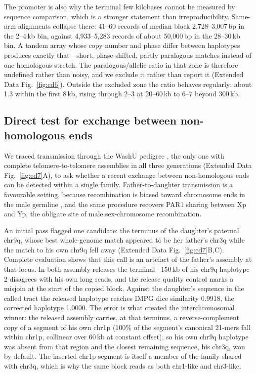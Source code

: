 \documentclass[pdflatex,mathphys]{jnl}
\begin{document}
The promoter is also why the terminal few kilobases cannot be measured by sequence comparison, which
is a stronger statement than irreproducibility. Same-arm alignments collapse there: 41--60 records of
median block 2,728--3,007\,bp in the 2--4\,kb bin, against 4,933--5,283 records of about
50,000\,bp in the 28--30\,kb bin. A tandem array whose copy number and phase differ between
haplotypes produces exactly that---short, phase-shifted, partly paralogous matches instead of one
homologous stretch. The paralogous/allelic ratio in that zone is therefore undefined rather than
noisy, and we exclude it rather than report it (Extended Data Fig.~\ref{fig:ed6}). Outside the
excluded zone the ratio behaves regularly: about 1.3 within the first 8\,kb, rising through 2--3 at
20--60\,kb to 6--7 beyond 300\,kb.

\subsection*{Direct test for exchange between non-homologous ends}

We traced transmission through the WashU pedigree \cite{Cechova2025}, the only one with complete
telomere-to-telomere assemblies in all three generations (Extended Data Fig.~\ref{fig:ed7}A), to ask whether a
recent exchange between non-homologous ends can be detected within a single family. Father-to-daughter
transmission is a favourable setting, because recombination is biased toward chromosome ends in the male
germline \cite{Bherer2017}, and the same procedure recovers PAR1 sharing between Xp and Yp, the
obligate site of male sex-chromosome recombination.

An initial pass flagged one candidate: the terminus of the daughter's paternal chr9q, whose best
whole-genome match appeared to be her father's chr3q while the match to his own chr9q fell away
(Extended Data Fig.~\ref{fig:ed7}B,C). Complete evaluation shows that this call is an artefact of the father's
assembly at that locus. In both assembly releases the terminal ~150\,kb of his chr9q haplotype 2
disagrees with his own long reads, and the release quality control marks a misjoin at the start of the copied block.
Against the daughter's sequence in the called tract the released haplotype reaches IMPG dice similarity 0.9918,
the corrected haplotype 1.0000.
The error is what created the interchromosomal winner: the released assembly carries, at that terminus,
a reverse-complement copy of a segment of his own chr1p (100\% of the segment's canonical 21-mers fall
within chr1p, collinear over 60\,kb at constant offset), so his own chr9q haplotype was absent from that
region and the closest remaining sequence, his chr3q, won by default. The inserted chr1p segment is
itself a member of the family shared with chr3q, which is why the same block reads as both chr1-like and
chr3-like.
\end{document}
